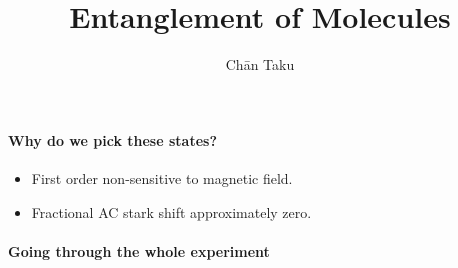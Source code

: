 \documentclass{article}
\title{Entanglement of Molecules}
\author{Ch\=an Taku}
\begin{document}
\maketitle

\paragraph*{Why do we pick these states?}
\begin{itemize}
    \item First order non-sensitive to magnetic field.
    \item Fractional AC stark shift approximately zero.
\end{itemize}

\paragraph*{Going through the whole experiment}%
\end{document}
